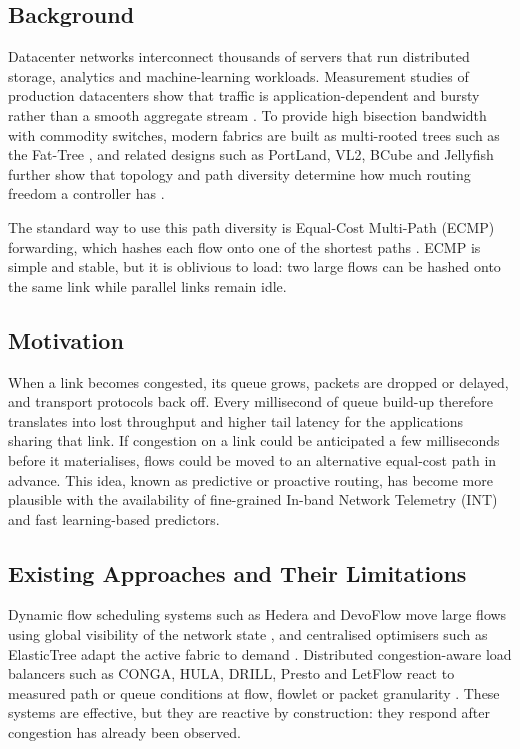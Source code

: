 \documentclass[conference]{IEEEtran}
\begin{document}
\subsection{Background}
Datacenter networks interconnect thousands of servers that run distributed storage, analytics and machine-learning workloads. Measurement studies of production datacenters show that traffic is application-dependent and bursty rather than a smooth aggregate stream \cite{benson2010network}. To provide high bisection bandwidth with commodity switches, modern fabrics are built as multi-rooted trees such as the Fat-Tree \cite{alfares2008}, and related designs such as PortLand, VL2, BCube and Jellyfish further show that topology and path diversity determine how much routing freedom a controller has \cite{mysore2009portland,greenberg2009vl2,guo2009bcube,singla2012jellyfish}.

The standard way to use this path diversity is Equal-Cost Multi-Path (ECMP) forwarding, which hashes each flow onto one of the shortest paths \cite{hopps2000}. ECMP is simple and stable, but it is oblivious to load: two large flows can be hashed onto the same link while parallel links remain idle.

\subsection{Motivation}
When a link becomes congested, its queue grows, packets are dropped or delayed, and transport protocols back off. Every millisecond of queue build-up therefore translates into lost throughput and higher tail latency for the applications sharing that link. If congestion on a link could be anticipated a few milliseconds before it materialises, flows could be moved to an alternative equal-cost path in advance. This idea, known as predictive or proactive routing, has become more plausible with the availability of fine-grained In-band Network Telemetry (INT) and fast learning-based predictors.

\subsection{Existing Approaches and Their Limitations}
Dynamic flow scheduling systems such as Hedera and DevoFlow move large flows using global visibility of the network state \cite{alfares2010hedera,curtis2011devoflow}, and centralised optimisers such as ElasticTree adapt the active fabric to demand \cite{heller2010elastictree}. Distributed congestion-aware load balancers such as CONGA, HULA, DRILL, Presto and LetFlow react to measured path or queue conditions at flow, flowlet or packet granularity \cite{alizadeh2014conga,katta2016hula,ghorbani2015drill,he2015presto,vanini2017letflow}. These systems are effective, but they are reactive by construction: they respond after congestion has already been observed.
\end{document}
